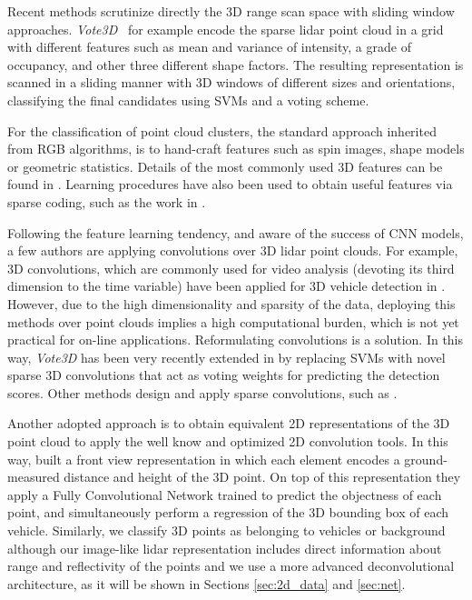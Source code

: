 \documentclass[letterpaper, 10 pt, conference]{ieeeconf}  %
\begin{document}
Recent methods scrutinize directly the 3D range scan space with sliding window approaches. 
\textit{Vote3D}~\cite{wang2015voting} for example encode the sparse lidar point cloud in a grid with different features such as mean and variance of intensity, a grade of occupancy, and other three different shape factors. The resulting representation is scanned in a sliding manner with 3D windows of different sizes and orientations, classifying the final candidates using SVMs and a voting scheme. 

For the classification of point cloud clusters, the standard approach inherited from RGB algorithms, is to hand-craft features such as spin images, shape models or geometric statistics. Details of the most commonly used 3D features can be found in \cite{behley2012performance}. 
Learning procedures have also been used to obtain useful features via sparse coding, such as the work in \cite{de2013unsupervised}. 

Following the feature learning tendency, and aware of the success of CNN models, a few authors are applying convolutions over 3D lidar point clouds. 
For example, 3D convolutions, which are commonly used for video analysis (devoting its third dimension to the time variable) have been applied for 3D vehicle detection in \cite{li20163d}. However, due to the high dimensionality and sparsity of the data, deploying this methods over point clouds implies a high computational burden, which is not yet practical for on-line applications.
Reformulating convolutions is a solution. In this way, \textit{Vote3D} has been very recently extended in \cite{engelcke2017vote3deep} by replacing SVMs with novel sparse 3D convolutions that act as voting weights for predicting the detection scores. Other methods design and apply sparse convolutions, such as \cite{jampani2016learning, graham2015sparse}.

Another adopted approach is to obtain equivalent 2D representations of the 3D point cloud to apply the well know and optimized 2D convolution tools. In this way, \cite{li2016vehicle} built a front view representation in which each element encodes a ground-measured distance and height of the 3D point. On top of this representation they apply a Fully Convolutional Network trained to predict the objectness of each point, and simultaneously perform a regression of the 3D bounding box of each vehicle. 
Similarly, we classify 3D points as belonging to vehicles or background although our image-like lidar representation includes direct information about range and reflectivity of the points and we use a more advanced deconvolutional architecture, as it will be shown in Sections \ref{sec:2d_data} and \ref{sec:net}.
\end{document}
